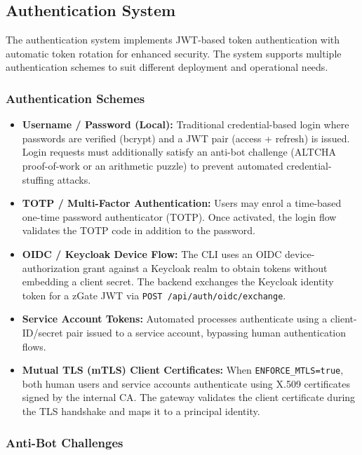 \subsection{Authentication System}
\label{subsec:authentication}

The authentication system implements JWT-based token authentication with automatic token rotation for enhanced security. The system supports multiple authentication schemes to suit different deployment and operational needs.

\subsubsection{Authentication Schemes}

\begin{itemize}[leftmargin=*]
    \item \textbf{Username / Password (Local):} Traditional credential-based login where passwords are verified (bcrypt) and a JWT pair (access + refresh) is issued. Login requests must additionally satisfy an anti-bot challenge (ALTCHA proof-of-work or an arithmetic puzzle) to prevent automated credential-stuffing attacks.
    \item \textbf{TOTP / Multi-Factor Authentication:} Users may enrol a time-based one-time password authenticator (TOTP). Once activated, the login flow validates the TOTP code in addition to the password.
    \item \textbf{OIDC / Keycloak Device Flow:} The CLI uses an OIDC device-authorization grant against a Keycloak realm to obtain tokens without embedding a client secret. The backend exchanges the Keycloak identity token for a zGate JWT via \texttt{POST /api/auth/oidc/exchange}.
    \item \textbf{Service Account Tokens:} Automated processes authenticate using a client-ID/secret pair issued to a service account, bypassing human authentication flows.
    \item \textbf{Mutual TLS (mTLS) Client Certificates:} When \texttt{ENFORCE\_MTLS=true}, both human users and service accounts authenticate using X.509 certificates signed by the internal CA. The gateway validates the client certificate during the TLS handshake and maps it to a principal identity.
\end{itemize}

\subsubsection{Anti-Bot Challenges}

